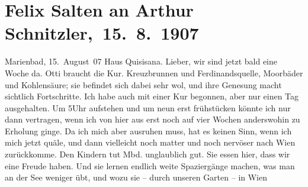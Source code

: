                \section[ Felix Salten an Arthur Schnitzler, 15. 8. 1907]{ Felix Salten an Arthur Schnitzler, 15. 8. 1907}\nopagebreak{}\rehead{ }\begin{ledgroupsized}[t]{13cm}\normalsize\beginnumbering{} \toendnotes[C]{\smallbreak\pagebreak[2]} 
\toendnotes[C]{\smallbreak}\pstart
           \raggedleft{}{\pb}Marienbad, 15. August 07\pend
           \pstart
           \raggedleft{}Haus Quisisana.\pend
           \pstart
           Lieber, wir sind jetzt bald eine Woche da. Otti braucht die Kur. Kreuzbrunnen und Ferdinandsquelle,
               Moorbäder und Kohlensäure; sie befindet sich dabei sehr wol, und ihre Genesung macht
               sichtlich Fortschritte. Ich habe auch mit einer Kur begonnen, aber nur einen Tag
               ausgehalten. Um 5Uhr aufstehen und um neun erst frühstücken
               könnte ich nur dann vertragen, wenn ich von hier aus erst noch auf vier Wochen
               anderswohin zu Erholung ginge. Da ich mich aber ausruhen muss, hat es keinen Sinn,
               wenn ich mich jetzt quäle, und dann vielleicht noch matter und noch nervöser nach Wien zurückkomme. Den Kindern tut Mbd. unglaublich gut. Sie essen hier, dass wir eine Freude
               haben. Und sie lernen endlich weite Spaziergänge machen, was man an der See weniger
               übt, und wozu sie – durch unseren Garten – in Wien

\end{ledgroupsized}

